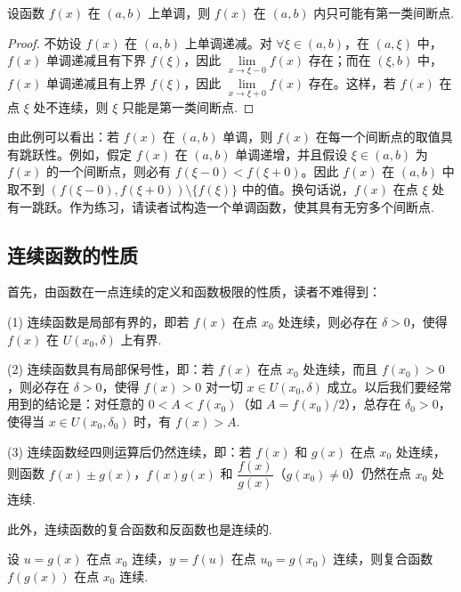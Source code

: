 \begin{example}\label{example:ma-3-2-9}
设函数 $f(x)$ 在 $(a,b)$ 上单调，则 $f(x)$ 在 $(a,b)$ 内只可能有第一类间断点.
\end{example}


\begin{proof}
不妨设 $f(x)$ 在 $(a,b)$ 上单调递减。对 $\forall\xi\in(a,b)$，在 $(a,\xi)$ 中，$f(x)$ 单调递减且有下界 $f(\xi)$，因此 $\lim\limits_{x\to\xi-0}f(x)$ 存在；而在 $(\xi,b)$ 中，$f(x)$ 单调递减且有上界 $f(\xi)$，因此 $\lim\limits_{x\to\xi+0}f(x)$ 存在。这样，若 $f(x)$ 在点 $\xi$ 处不连续，则 $\xi$ 只能是第一类间断点.
\end{proof}


\begin{remark}\label{remark:ma-3-source-78}
由此例可以看出：若 $f(x)$ 在 $(a,b)$ 单调，则 $f(x)$ 在每一个间断点的取值具有跳跃性。例如，假定 $f(x)$ 在 $(a,b)$ 单调递增，并且假设 $\xi\in(a,b)$ 为 $f(x)$ 的一个间断点，则必有 $f(\xi-0)<f(\xi+0)$。因此 $f(x)$ 在 $(a,b)$ 中取不到 $(f(\xi-0),f(\xi+0))\setminus\{f(\xi)\}$ 中的值。换句话说，$f(x)$ 在点 $\xi$ 处有一跳跃。作为练习，请读者试构造一个单调函数，使其具有无穷多个间断点.
\end{remark}


\subsection{连续函数的性质}
\label{subsec:ma-3-2-2}

首先，由函数在一点连续的定义和函数极限的性质，读者不难得到：

(1) 连续函数是局部有界的，即若 $f(x)$ 在点 $x_0$ 处连续，则必存在 $\delta>0$，使得 $f(x)$ 在 $U(x_0,\delta)$ 上有界.

(2) 连续函数具有局部保号性，即：若 $f(x)$ 在点 $x_0$ 处连续，而且 $f(x_0)>0$，则必存在 $\delta>0$，使得 $f(x)>0$ 对一切 $x\in U(x_0,\delta)$ 成立。以后我们要经常用到的结论是：对任意的 $0<A<f(x_0)$（如 $A=f(x_0)/2$），总存在 $\delta_0>0$，使得当 $x\in U(x_0,\delta_0)$ 时，有 $f(x)>A$.

(3) 连续函数经四则运算后仍然连续，即：若 $f(x)$ 和 $g(x)$ 在点 $x_0$ 处连续，则函数 $f(x)\pm g(x)$，$f(x)g(x)$ 和 $\dfrac{f(x)}{g(x)}$（$g(x_0)\ne0$）仍然在点 $x_0$ 处连续.

此外，连续函数的复合函数和反函数也是连续的.

\begin{theorem}[{复合函数的连续性}]\label{theorem:ma-3-2-1}
设 $u=g(x)$ 在点 $x_0$ 连续，$y=f(u)$ 在点 $u_0=g(x_0)$ 连续，则复合函数 $f(g(x))$ 在点 $x_0$ 连续.
\end{theorem}


